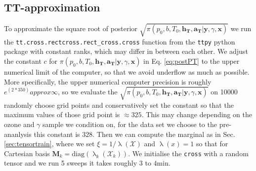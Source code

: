 \subsection{TT-approximation}
To approximate the square root of posterior $\sqrt{\pi(p_0,b,T_0,\bm{h_T},\bm{a_T} | \bm{y}, \gamma, \bm{x})}$ we run the  \texttt{tt.cross.rectcross.rect\_cross.cross} function from the \texttt{ttpy} python package \cite{Oseledets2018ttpy} with constant ranks, which may differ in between each other.
We adjust the constant $c$ for $\pi(p_0,b,T_0,\bm{h_T},\bm{a_T} | \bm{y}, \gamma, \bm{x})$ in Eq. \ref{eq:postPT} to the upper numerical limit of the computer, so that we avoid underflow as much as possible.
More specifically, the upper numerical computer precision is roughly $e^(2*350) approx \infty$, so we evaluate the  $\sqrt{\pi(p_0,b,T_0,\bm{h_T},\bm{a_T} | \bm{y}, \gamma, \bm{x})}$ on 10000 randomly choose grid points and conservatively set the constant so that the maximum values of those grid point is $\approx 325$.
This may change depending on the ozone and $\gamma$ sample we condition on, for the data set we choose to the pre-ananlysis this constant is $328$. 
Then we can compute the marginal as in Sec. \ref{sec:tensortrain}, where we set $\xi = 1 / \uplambda (\mathcal{X})$ and $\uplambda(x) = 1$ so that for Cartesian basis $\bm{M}_k = \text{diag}(\uplambda_k(\mathcal{X}_k))$.
We initialise the \texttt{cross}  with a random tensor and we run 5 sweeps it takes roughly $3$ to $4$min.

